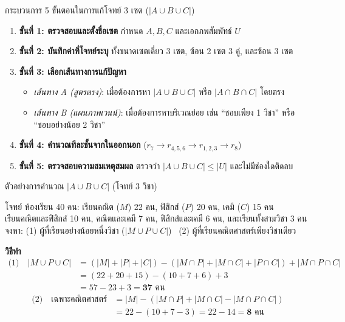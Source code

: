 \begin{frame}{กระบวนการ 5 ขั้นตอนในการแก้โจทย์ 3 เซต ($|A \cup B \cup C|$)}
  \begin{enumerate}\small
    \item \textbf{ขั้นที่ 1: ตรวจสอบและตั้งชื่อเซต} กำหนด $A, B, C$ และเอกภพสัมพัทธ์ $U$
    \item \textbf{ขั้นที่ 2: บันทึกค่าที่โจทย์ระบุ} ทั้งขนาดเซตเดี่ยว 3 เซต, ซ้อน 2 เซต 3 คู่, และซ้อน 3 เซต
    \item \textbf{ขั้นที่ 3: เลือกเส้นทางการแก้ปัญหา}
          \begin{itemize}\footnotesize
            \item \emph{เส้นทาง A (สูตรตรง)}: เมื่อต้องการหา $|A \cup B \cup C|$ หรือ $|A \cap B \cap C|$ โดยตรง
            \item \emph{เส้นทาง B (แผนภาพเวนน์)}: เมื่อต้องการหาบริเวณย่อย เช่น ``ชอบเพียง 1 วิชา'' หรือ ``ชอบอย่างน้อย 2 วิชา''
          \end{itemize}
    \item \textbf{ขั้นที่ 4: คำนวณทีละชั้นจากในออกนอก} ($r_7 \to r_{4,5,6} \to r_{1,2,3} \to r_8$)
    \item \textbf{ขั้นที่ 5: ตรวจสอบความสมเหตุสมผล} ตรวจว่า $|A \cup B \cup C| \leq |U|$ และไม่มีช่องใดติดลบ
  \end{enumerate}
\end{frame}

\begin{frame}{ตัวอย่างการคำนวณ $|A \cup B \cup C|$ (โจทย์ 3 วิชา)}
  \begin{block}{โจทย์}
    ห้องเรียน 40 คน: เรียนคณิต ($M$) 22 คน, ฟิสิกส์ ($P$) 20 คน, เคมี ($C$) 15 คน \\
    เรียนคณิตและฟิสิกส์ 10 คน, คณิตและเคมี 7 คน, ฟิสิกส์และเคมี 6 คน, และเรียนทั้งสามวิชา 3 คน \\
    จงหา: (1) ผู้ที่เรียนอย่างน้อยหนึ่งวิชา ($|M \cup P \cup C|$) \ (2) ผู้ที่เรียนคณิตศาสตร์เพียงวิชาเดียว
  \end{block}
  \pause
  \textbf{วิธีทำ}
  \begin{align*}
    \text{(1)}\quad |M \cup P \cup C| &= (|M| + |P| + |C|) - (|M \cap P| + |M \cap C| + |P \cap C|) + |M \cap P \cap C| \\
                                      &= (22 + 20 + 15) - (10 + 7 + 6) + 3 \\
                                      &= 57 - 23 + 3 = \mathbf{37} \text{ คน}
  \end{align*}
  \begin{align*}
    \text{(2)}\quad \text{เฉพาะคณิตศาสตร์} &= |M| - (|M \cap P| + |M \cap C| - |M \cap P \cap C|) \\
                                           &= 22 - (10 + 7 - 3) = 22 - 14 = \mathbf{8} \text{ คน}
  \end{align*}
\end{frame}

